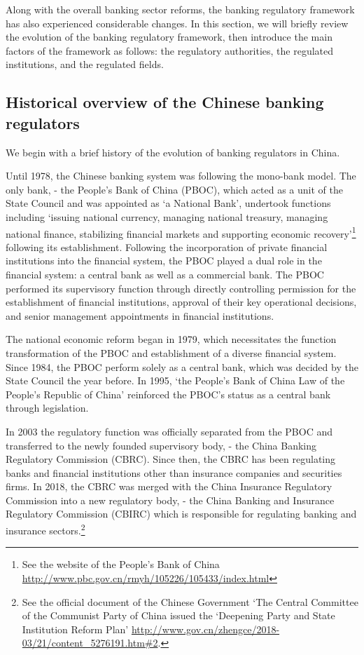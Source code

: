 \documentclass[
  letterpaper,
  DIV=11,
  numbers=noendperiod]{scrreprt}
\begin{document}
Along with the overall banking sector reforms, the banking regulatory
framework has also experienced considerable changes. In this section, we
will briefly review the evolution of the banking regulatory framework,
then introduce the main factors of the framework as follows: the
regulatory authorities, the regulated institutions, and the regulated
fields.

\subsection{Historical overview of the Chinese banking
regulators}\label{historical-overview-of-the-chinese-banking-regulators}

We begin with a brief history of the evolution of banking regulators in
China.

Until 1978, the Chinese banking system was following the mono-bank
model. The only bank, - the People's Bank of China (PBOC), which acted
as a unit of the State Council and was appointed as `a National Bank',
undertook functions including `issuing national currency, managing
national treasury, managing national finance, stabilizing financial
markets and supporting economic recovery'\footnote{See the website of
  the People's Bank of China
  \url{http://www.pbc.gov.cn/rmyh/105226/105433/index.html}} following
its establishment. Following the incorporation of private financial
institutions into the financial system, the PBOC played a dual role in
the financial system: a central bank as well as a commercial bank. The
PBOC performed its supervisory function through directly controlling
permission for the establishment of financial institutions, approval of
their key operational decisions, and senior management appointments in
financial institutions.

The national economic reform began in 1979, which necessitates the
function transformation of the PBOC and establishment of a diverse
financial system. Since 1984, the PBOC perform solely as a central bank,
which was decided by the State Council the year before. In 1995, `the
People's Bank of China Law of the People's Republic of China' reinforced
the PBOC's status as a central bank through legislation.

In 2003 the regulatory function was officially separated from the PBOC
and transferred to the newly founded supervisory body, - the China
Banking Regulatory Commission (CBRC). Since then, the CBRC has been
regulating banks and financial institutions other than insurance
companies and securities firms. In 2018, the CBRC was merged with the
China Insurance Regulatory Commission into a new regulatory body, - the
China Banking and Insurance Regulatory Commission (CBIRC) which is
responsible for regulating banking and insurance sectors.\footnote{See
  the official document of the Chinese Government `The Central Committee
  of the Communist Party of China issued the `Deepening Party and State
  Institution Reform Plan'
  \url{http://www.gov.cn/zhengce/2018-03/21/content_5276191.htm\#2}.}
\end{document}
